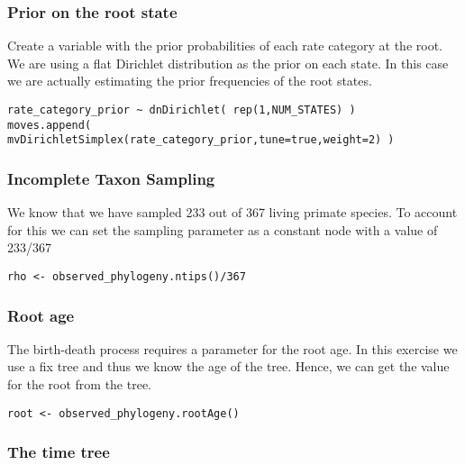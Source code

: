 \subsubsection{Prior on the root state}
Create a variable with the prior probabilities of each rate category at the root.
We are using a flat Dirichlet distribution as the prior on each state.
In this case we are actually estimating the prior frequencies of the root states.
{\tt \begin{snugshade*}
\begin{lstlisting}
rate_category_prior ~ dnDirichlet( rep(1,NUM_STATES) )
moves.append( mvDirichletSimplex(rate_category_prior,tune=true,weight=2) )
\end{lstlisting}
\end{snugshade*}}

\subsubsection{Incomplete Taxon Sampling}

We know that we have sampled 233 out of 367 living primate species. 
To account for this we can set the sampling parameter as a constant node with a value of 233/367
{\tt \begin{snugshade*}
\begin{lstlisting}
rho <- observed_phylogeny.ntips()/367
\end{lstlisting}
\end{snugshade*}}


\subsubsection{Root age}

The birth-death process requires a parameter for the root age.
In this exercise we use a fix tree and thus we know the age of the tree.
Hence, we can get the value for the root from the \citet{MagnusonFord2012} tree.
{\tt \begin{snugshade*}
\begin{lstlisting}
root <- observed_phylogeny.rootAge()
\end{lstlisting}
\end{snugshade*}}

\subsubsection{The time tree}

